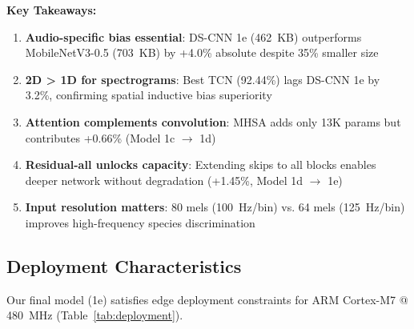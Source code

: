 \documentclass[10pt,a4paper,twoside]{article}
\begin{document}
\noindent\textbf{Key Takeaways:}
\begin{enumerate}
	\item \textbf{Audio-specific bias essential}: DS-CNN 1e (462~KB) outperforms MobileNetV3-0.5 (703~KB) by +4.0\% absolute despite 35\% smaller size
	\item \textbf{2D > 1D for spectrograms}: Best TCN (92.44\%) lags DS-CNN 1e by 3.2\%, confirming spatial inductive bias superiority
	\item \textbf{Attention complements convolution}: MHSA adds only 13K params but contributes +0.66\% (Model 1c $\to$ 1d)
	\item \textbf{Residual-all unlocks capacity}: Extending skips to all blocks enables deeper network without degradation (+1.45\%, Model 1d $\to$ 1e)
	\item \textbf{Input resolution matters}: 80 mels (100~Hz/bin) vs. 64 mels (125~Hz/bin) improves high-frequency species discrimination
\end{enumerate}

\subsection{Deployment Characteristics}
\label{sec:deployment}

Our final model (1e) satisfies edge deployment constraints for ARM Cortex-M7 @ 480~MHz (Table~\ref{tab:deployment}).
\end{document}
